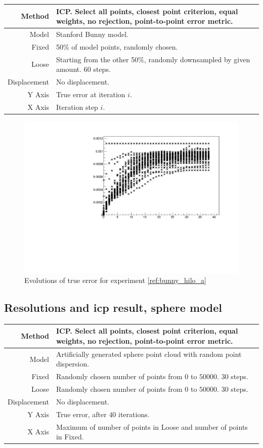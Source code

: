 \begin{tabularx}{\textwidth}{|r|X|} \hline
Method & ICP. Select all points, closest point criterion, equal weights, no rejection, point-to-point error metric. \\ \hline
Model & Stanford Bunny model. \\ \hline
Fixed & 50\% of model points, randomly chosen. \\ \hline
Loose & Starting from the other 50\%, randomly downsampled by given amount. $60$ steps. \\ \hline
Displacement & No displacement. \\ \hline
Y Axis & True error at iteration $i$. \\\hline
X Axis & Iteration step $i$. \\ \hline
\end{tabularx}

\begin{figure}[H]
\centering
\includegraphics[width=.7\textwidth]{fig/bunny_globmin_ev.pdf}
\caption{Evolutions of true error for experiment \ref{ref:bunny_hilo_a}}
\label{fig:bunny_hilo_ev}
\end{figure}


\subsection{Resolutions and \gls{icp} result, sphere model} \label{sec:ex_sphere_hilo}
\begin{tabularx}{\textwidth}{|r|X|} \hline
Method & ICP. Select all points, closest point criterion, equal weights, no rejection, point-to-point error metric. \\ \hline
Model & Artificially generated sphere point cloud with random point dispersion. \\ \hline
Fixed & Randomly chosen number of points from $0$ to $50000$. $30$ steps. \\ \hline
Loose & Randomly chosen number of points from $0$ to $50000$. $30$ steps. \\ \hline
Displacement & No displacement. \\ \hline
Y Axis & True error, after $40$ iterations. \\\hline
X Axis & Maximum of number of points in Loose and number of points in Fixed. \\ \hline
\end{tabularx}

